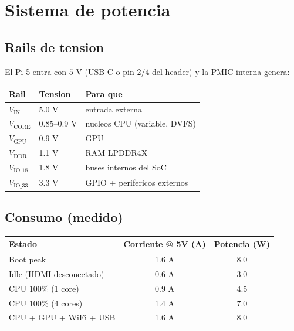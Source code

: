 \documentclass[11pt,a4paper,oneside]{report}
\begin{document}
\chapter{Sistema de potencia}

\section{Rails de tension}

El Pi 5 entra con $5$ V (USB-C o pin 2/4 del header) y la PMIC interna genera:

\begin{center}
\begin{tabular}{lll}
\toprule
\textbf{Rail} & \textbf{Tension} & \textbf{Para que} \\
\midrule
$V_{\text{IN}}$        & 5.0 V & entrada externa \\
$V_{\text{CORE}}$      & 0.85--0.9 V & nucleos CPU (variable, DVFS) \\
$V_{\text{GPU}}$       & 0.9 V       & GPU \\
$V_{\text{DDR}}$       & 1.1 V       & RAM LPDDR4X \\
$V_{\text{IO\_18}}$    & 1.8 V       & buses internos del SoC \\
$V_{\text{IO\_33}}$    & 3.3 V       & GPIO + perifericos externos \\
\bottomrule
\end{tabular}
\end{center}

\section{Consumo (medido)}

\begin{center}
\begin{tabular}{lcc}
\toprule
\textbf{Estado} & \textbf{Corriente @ 5V (A)} & \textbf{Potencia (W)} \\
\midrule
Boot peak               & 1.6 A & 8.0 \\
Idle (HDMI desconectado) & 0.6 A & 3.0 \\
CPU 100\% (1 core)      & 0.9 A & 4.5 \\
CPU 100\% (4 cores)     & 1.4 A & 7.0 \\
CPU + GPU + WiFi + USB  & 1.6 A & 8.0 \\
\bottomrule
\end{tabular}
\end{center}
\end{document}
